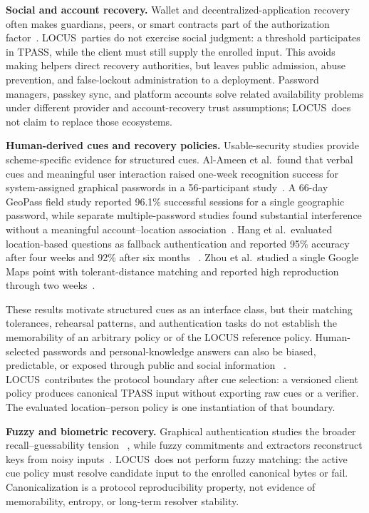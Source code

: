 \documentclass[sigconf,anonymous]{acmart}
\newcounter{protocol}
\newcommand{\LOCUS}{\textsf{LOCUS}}
\begin{document}
\textbf{Social and account recovery.}
Wallet and decentralized-application recovery often makes guardians, peers, or
smart contracts part of the authorization factor~\cite{DAppRecovery2019,CRSA2021,SocialWallet2023}.
\LOCUS\ parties do not exercise social judgment: a threshold participates in
TPASS, while the client must still supply the enrolled input. This avoids making
helpers direct recovery authorities, but leaves public admission, abuse
prevention, and false-lockout administration to a deployment. Password managers,
passkey sync, and platform accounts solve related availability problems under
different provider and account-recovery trust assumptions; \LOCUS\ does not
claim to replace those ecosystems.

\textbf{Human-derived cues and recovery policies.}
Usable-security studies provide scheme-specific evidence for structured cues.
Al-Ameen et al.\ found that verbal cues and meaningful user interaction raised
one-week recognition success for system-assigned graphical passwords in a
56-participant study~\cite{AlAmeen2015Cues}. A 66-day GeoPass field study
reported 96.1\% successful sessions for a single geographic password, while
separate multiple-password studies found substantial interference without a
meaningful account--location association~\cite{AlAmeen2017GeoPass}. Hang et
al.\ evaluated location-based questions as fallback authentication and reported
95\% accuracy after four weeks and 92\% after six months
~\cite{Hang2015LocationFallback}. Zhou et al.\ studied a single Google Maps
point with tolerant-distance matching and reported high reproduction through
two weeks~\cite{Zhou2025MapPasswords}.

These results motivate structured cues as an interface class, but their matching
tolerances, rehearsal patterns, and authentication tasks do not establish the
memorability of an arbitrary policy or of the LOCUS reference policy.
Human-selected passwords and personal-knowledge answers can also be biased,
predictable, or exposed through public and social information
~\cite{Bonneau2015Secrets,Yan2004Password}. \LOCUS\ contributes the protocol
boundary after cue selection: a versioned client policy produces canonical
TPASS input without exporting raw cues or a verifier. The evaluated
location--person policy is one instantiation of that boundary.

\textbf{Fuzzy and biometric recovery.}
Graphical authentication studies the broader recall--guessability tension
~\cite{Biddle2012Graphical}, while fuzzy commitments and extractors reconstruct
keys from noisy inputs~\cite{FuzzyCommitment1999,FuzzyExtractors2004}. \LOCUS\
does not perform fuzzy matching: the active cue policy must resolve candidate
input to the enrolled canonical bytes or fail. Canonicalization is a protocol
reproducibility property, not evidence of memorability, entropy, or long-term
resolver stability.
\end{document}
